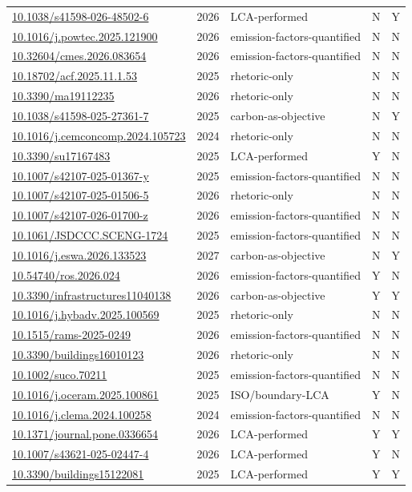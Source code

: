 \documentclass[pdflatex,sn-basic]{sn-jnl}
\begin{document}
{\begin{longtable}{p{}lp{}lp{}}
\url{10.1038/s41598-026-48502-6} & 2026 & LCA-performed & N & Y \\
\url{10.1016/j.powtec.2025.121900} & 2026 & emission-factors-quantified & N & N \\
\url{10.32604/cmes.2026.083654} & 2026 & emission-factors-quantified & N & N \\
\url{10.18702/acf.2025.11.1.53} & 2025 & rhetoric-only & N & N \\
\url{10.3390/ma19112235} & 2026 & rhetoric-only & N & N \\
\url{10.1038/s41598-025-27361-7} & 2025 & carbon-as-objective & N & Y \\
\url{10.1016/j.cemconcomp.2024.105723} & 2024 & rhetoric-only & N & N \\
\url{10.3390/su17167483} & 2025 & LCA-performed & Y & N \\
\url{10.1007/s42107-025-01367-y} & 2025 & emission-factors-quantified & N & N \\
\url{10.1007/s42107-025-01506-5} & 2026 & rhetoric-only & N & N \\
\url{10.1007/s42107-026-01700-z} & 2026 & emission-factors-quantified & N & N \\
\url{10.1061/JSDCCC.SCENG-1724} & 2025 & emission-factors-quantified & N & N \\
\url{10.1016/j.eswa.2026.133523} & 2027 & carbon-as-objective & N & Y \\
\url{10.54740/ros.2026.024} & 2026 & emission-factors-quantified & Y & N \\
\url{10.3390/infrastructures11040138} & 2026 & carbon-as-objective & Y & Y \\
\url{10.1016/j.hybadv.2025.100569} & 2025 & rhetoric-only & N & N \\
\url{10.1515/rams-2025-0249} & 2026 & emission-factors-quantified & N & N \\
\url{10.3390/buildings16010123} & 2026 & rhetoric-only & N & N \\
\url{10.1002/suco.70211} & 2025 & emission-factors-quantified & N & N \\
\url{10.1016/j.oceram.2025.100861} & 2025 & ISO/boundary-LCA & Y & N \\
\url{10.1016/j.clema.2024.100258} & 2024 & emission-factors-quantified & N & N \\
\url{10.1371/journal.pone.0336654} & 2026 & LCA-performed & Y & Y \\
\url{10.1007/s43621-025-02447-4} & 2026 & LCA-performed & Y & N \\
\url{10.3390/buildings15122081} & 2025 & LCA-performed & Y & Y \\

\end{longtable}}
\end{document}

